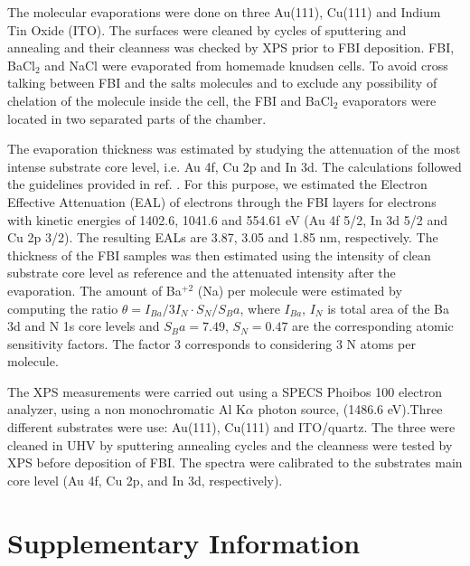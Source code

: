 \documentclass[aps,prl,reprint,longbibliography,superscriptaddress]{revtex4-1}
\def\BaCl{BaCl$_2$ }
\def\Ba{Ba$^{+2}$ }
\begin{document}
 The molecular evaporations were done on three Au(111), Cu(111) and Indium Tin Oxide (ITO). The surfaces were cleaned by cycles of sputtering and annealing and their cleanness was checked by XPS prior to FBI deposition. FBI, \BaCl and NaCl were evaporated from homemade knudsen cells. To avoid cross talking between FBI and the salts molecules and to exclude any possibility of chelation of the molecule inside the cell, the FBI and \BaCl  evaporators were located in two separated parts of the chamber.
 
The evaporation thickness was estimated by studying the attenuation of the most intense substrate core level, i.e. Au 4f, Cu 2p and In 3d. The calculations followed the guidelines provided in ref. \cite{powell_practical_2020}. For this purpose, we estimated the Electron Effective Attenuation (EAL) of electrons through the FBI layers for electrons with kinetic energies of 1402.6, 1041.6 and 554.61 eV (Au 4f 5/2, In 3d 5/2 and Cu 2p 3/2). The resulting EALs are 3.87, 3.05 and 1.85 nm, respectively. The thickness of the FBI samples was then estimated using the intensity of clean substrate core level as reference and the attenuated intensity after the evaporation. The amount of \Ba (Na) per molecule were estimated by computing  the ratio $\theta=I_{Ba}/3I_N \cdot S_N/S_Ba $, where $I_{Ba}$, $I_N$ is total area  of the  Ba 3d  and  N 1s  core  levels and $S_Ba = 7.49$, $S_N = 0.47$ are the corresponding atomic sensitivity factors\cite{Moulder1992HandbookOX}. The factor 3 corresponds to considering 3 N atoms per molecule.

The XPS measurements were carried out using a SPECS Phoibos 100 electron analyzer, using a non monochromatic Al K$\alpha$ photon source, (1486.6 eV).Three different substrates were use: Au(111), Cu(111) and  ITO/quartz. The three were cleaned in UHV by sputtering annealing cycles and the cleanness were tested by XPS before deposition of FBI. The spectra were calibrated to the substrates main core level (Au 4f, Cu 2p, and In 3d, respectively). 

 



\section{Supplementary Information}
\end{document}
